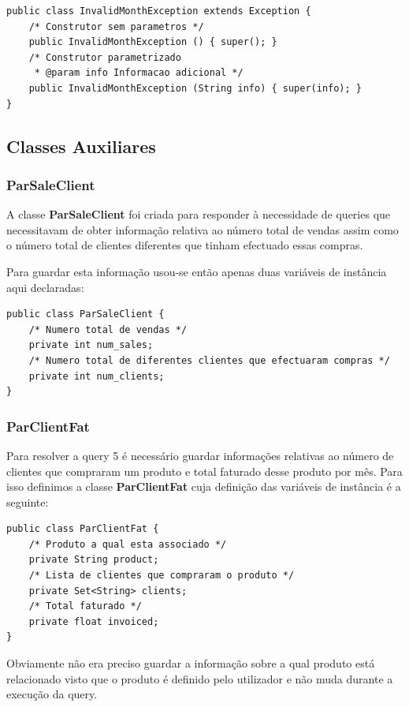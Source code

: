 \documentclass[10pt] {article}
\begin{document}
\begin{lstlisting}
public class InvalidMonthException extends Exception {
	/* Construtor sem parametros */
	public InvalidMonthException () { super(); }
	/* Construtor parametrizado
	 * @param info Informacao adicional */
	public InvalidMonthException (String info) { super(info); }
}
\end{lstlisting}

\subsection{Classes Auxiliares}
\subsubsection{ParSaleClient}

A classe \color{blue} \textbf{ParSaleClient} \color{black} foi criada para responder à necessidade de queries que necessitavam de obter informação relativa ao número total de vendas assim como o número total de clientes diferentes que tinham efectuado essas compras.

Para guardar esta informação usou-se então apenas duas variáveis de instância aqui declaradas:

\begin{lstlisting}
public class ParSaleClient {
	/* Numero total de vendas */
	private int num_sales;
	/* Numero total de diferentes clientes que efectuaram compras */
	private int num_clients;
}
\end{lstlisting}

\subsubsection{ParClientFat}

Para resolver a query 5 é necessário guardar informações relativas ao número de clientes que compraram um produto e total faturado desse produto por mês. Para isso definimos a classe \color{blue} \textbf{ParClientFat} \color{black} cuja definição das variáveis de
instância é a seguinte:

\begin{lstlisting}
public class ParClientFat {
	/* Produto a qual esta associado */
	private String product;
	/* Lista de clientes que compraram o produto */
	private Set<String> clients;
	/* Total faturado */
	private float invoiced;
}
\end{lstlisting}


Obviamente não era preciso guardar a informação sobre a qual produto está relacionado visto que o produto é definido pelo utilizador e não muda durante a execução da query.
\end{document}
